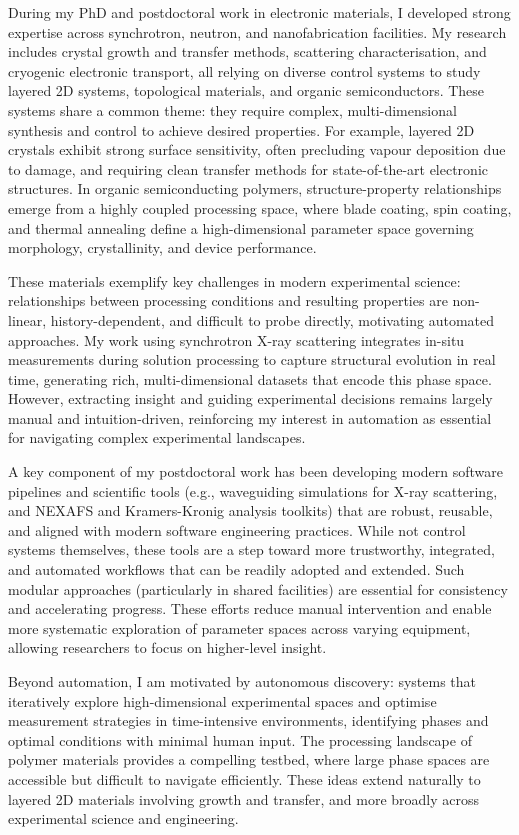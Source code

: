 \documentclass[10pt,a4paper,ragged2e,withhyper,paragraphstrue]{altacv}
\newcommand{\pind}{\hspace{24pt}}
\begin{document}
{    \pind{} During my PhD and postdoctoral work in electronic materials, I developed strong expertise across synchrotron, neutron, and nanofabrication facilities. My research includes crystal growth and transfer methods, scattering characterisation, and cryogenic electronic transport, all relying on diverse control systems to study layered 2D systems, topological materials, and organic semiconductors. These systems share a common theme: they require complex, multi-dimensional synthesis and control to achieve desired properties. For example, layered 2D crystals exhibit strong surface sensitivity, often precluding vapour deposition due to damage, and requiring clean transfer methods for state-of-the-art electronic structures. In organic semiconducting polymers, structure-property relationships emerge from a highly coupled processing space, where blade coating, spin coating, and thermal annealing define a high-dimensional parameter space governing morphology, crystallinity, and device performance.

    \pind{} These materials exemplify key challenges in modern experimental science: relationships between processing conditions and resulting properties are non-linear, history-dependent, and difficult to probe directly, motivating automated approaches. My work using synchrotron X-ray scattering integrates in-situ measurements during solution processing to capture structural evolution in real time, generating rich, multi-dimensional datasets that encode this phase space. However, extracting insight and guiding experimental decisions remains largely manual and intuition-driven, reinforcing my interest in automation as essential for navigating complex experimental landscapes.

    \pind{} A key component of my postdoctoral work has been developing modern software pipelines and scientific tools (e.g., waveguiding simulations for X-ray scattering, and NEXAFS and Kramers-Kronig analysis toolkits) that are robust, reusable, and aligned with modern software engineering practices. While not control systems themselves, these tools are a step toward more trustworthy, integrated, and automated workflows that can be readily adopted and extended. Such modular approaches (particularly in shared facilities) are essential for consistency and accelerating progress. These efforts reduce manual intervention and enable more systematic exploration of parameter spaces across varying equipment, allowing researchers to focus on higher-level insight.

    \pind{} Beyond automation, I am motivated by autonomous discovery: systems that iteratively explore high-dimensional experimental spaces and optimise measurement strategies in time-intensive environments, identifying phases and optimal conditions with minimal human input. The processing landscape of polymer materials provides a compelling testbed, where large phase spaces are accessible but difficult to navigate efficiently. These ideas extend naturally to layered 2D materials involving growth and transfer, and more broadly across experimental science and engineering.

}
\end{document}
